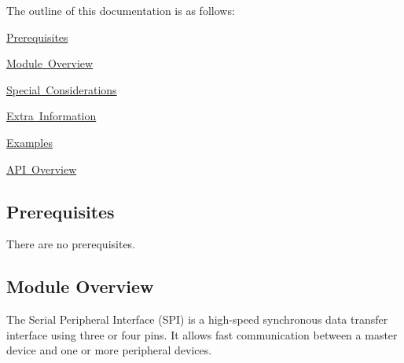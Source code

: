 The outline of this documentation is as follows\+:
\begin{DoxyItemize}
\item \mbox{\hyperlink{group__asfdoc__sam0__sercom__spi__group_asfdoc_sam0_sercom_spi_prerequisites}{Prerequisites}}
\item \mbox{\hyperlink{group__asfdoc__sam0__sercom__spi__group_asfdoc_sam0_sercom_spi_module_overview}{Module Overview}}
\item \mbox{\hyperlink{group__asfdoc__sam0__sercom__spi__group_asfdoc_sam0_sercom_spi_special_considerations}{Special Considerations}}
\item \mbox{\hyperlink{group__asfdoc__sam0__sercom__spi__group_asfdoc_sam0_sercom_spi_extra_info}{Extra Information}}
\item \mbox{\hyperlink{group__asfdoc__sam0__sercom__spi__group_asfdoc_sam0_sercom_spi_examples}{Examples}}
\item \mbox{\hyperlink{group__asfdoc__sam0__sercom__spi__group_asfdoc_sam0_sercom_spi_api_overview}{A\+PI Overview}}
\end{DoxyItemize}\hypertarget{group__asfdoc__sam0__sercom__spi__group_asfdoc_sam0_sercom_spi_prerequisites}{}\subsection{Prerequisites}\label{group__asfdoc__sam0__sercom__spi__group_asfdoc_sam0_sercom_spi_prerequisites}
There are no prerequisites.\hypertarget{group__asfdoc__sam0__sercom__spi__group_asfdoc_sam0_sercom_spi_module_overview}{}\subsection{Module Overview}\label{group__asfdoc__sam0__sercom__spi__group_asfdoc_sam0_sercom_spi_module_overview}
The Serial Peripheral Interface (S\+PI) is a high-\/speed synchronous data transfer interface using three or four pins. It allows fast communication between a master device and one or more peripheral devices.

